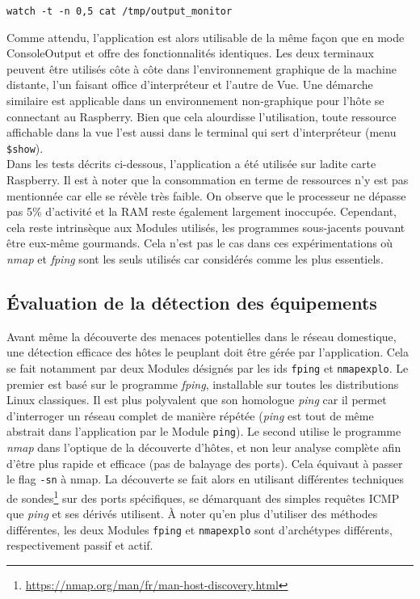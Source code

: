 \documentclass[]{article}
\begin{document}
\indent \texttt{watch -t -n 0,5 cat /tmp/output\_monitor}
\vspace{0.4cm}

Comme attendu, l'application est alors utilisable de la même façon que en mode ConsoleOutput et offre des fonctionnalités identiques. Les deux terminaux peuvent être utilisés côte à côte dans l'environnement graphique de la machine distante, l'un faisant office d'interpréteur et l'autre de Vue. Une démarche similaire est applicable dans un environnement non-graphique pour l'hôte se connectant au Raspberry. Bien que cela alourdisse l'utilisation, toute ressource affichable dans la vue l'est aussi dans le terminal qui sert d'interpréteur (menu \texttt{\$show}).\\

Dans les tests décrits ci-dessous, l'application a été utilisée sur ladite carte Raspberry. Il est à noter que la consommation en terme de ressources n'y est pas mentionnée car elle se révèle très faible. On observe que le processeur ne dépasse pas 5\% d'activité et la RAM reste également largement inoccupée. Cependant, cela reste intrinsèque aux Modules utilisés, les programmes sous-jacents pouvant être eux-même gourmands. Cela n'est pas le cas dans ces expérimentations où \textit{nmap} et \textit{fping} sont les seuls utilisés car considérés comme les plus essentiels.


\subsection{Évaluation de la détection des équipements}

Avant même la découverte des menaces potentielles dans le réseau domestique, une détection efficace des hôtes le peuplant doit être gérée par l'application. Cela se fait notamment par deux Modules désignés par les ids \texttt{fping} et \texttt{nmapexplo}. Le premier est basé sur le programme \textit{fping}, installable sur toutes les distributions Linux classiques. Il est plus polyvalent que son homologue \textit{ping} car il permet d'interroger un réseau complet de manière répétée (\textit{ping} est tout de même abstrait dans l'application par le Module \texttt{ping}). Le second utilise le programme \textit{nmap} dans l'optique de la découverte d'hôtes, et non leur analyse complète afin d'être plus rapide et efficace (pas de balayage des ports). Cela équivaut à passer le flag \texttt{-sn} à nmap. La découverte se fait alors en utilisant différentes techniques de sondes\footnote{\url{https://nmap.org/man/fr/man-host-discovery.html}} sur des ports spécifiques, se démarquant des simples requêtes ICMP que \textit{ping} et ses dérivés utilisent. À noter qu'en plus d'utiliser des méthodes différentes, les deux Modules \texttt{fping} et \texttt{nmapexplo} sont d'archétypes différents, respectivement passif et actif.\\
\end{document}
